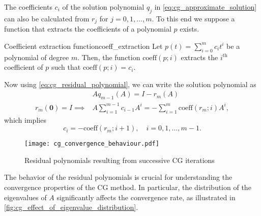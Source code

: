 The coefficients $c_i$ of the solution polynomial $q_j$ in \cref{eq:cg_approximate_solution} can also be calculated from $r_j$ for $j=0,1,\dots,m$. To this end we suppose a function that extracts the coefficients of a polynomial $p$ exists.
\begin{fancydef}{Coefficient extraction function}{coeff_extraction}
  Let $p(t) = \sum_{i=0}^m c_i t^i$ be a polynomial of degree $m$. Then, the function $\text{coeff}(p;i)$ extracts the $i^{\text{th}}$ coefficient of $p$ such that $\text{coeff}(p;i) = c_i$.
\end{fancydef}
Now using \cref{eq:cg_residual_polynomial}, we can write the solution polynomial as
\begin{align*}
                              & Aq_{m-1}(A) = I - r_m(A)                                                  \\
  r_m(\mathbf{0}) = I\implies & A\sum_{i=1}^{m-1} c_{i-1} A^i = -\sum_{i=1}^{m} \text{coeff}(r_m; i) A^i,
\end{align*}
which implies
\begin{equation}
  c_i = -\text{coeff}(r_m; i+1), \quad i = 0, 1, \dots, m-1.
  \label{eq:cg_solution_coefficients}
\end{equation}
\begin{figure}[H]
  \centering
  \texttt{[image: cg\_convergence\_behaviour.pdf]}
  \caption{Residual polynomials resulting from successive CG iterations}
  \label{fig:cg_convergence_behaviour}
\end{figure}

The behavior of the residual polynomials is crucial for understanding the convergence properties of the CG method. In particular, the distribution of the eigenvalues of $A$ significantly affects the convergence rate, as illustrated in \cref{fig:cg_effect_of_eigenvalue_distribution}.

